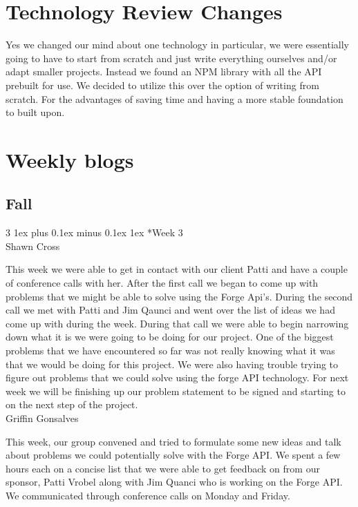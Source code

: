 \documentclass[letterpaper, 10pt, draftclsnofoot, compsoc, onecolumn]{IEEEtran}
\makeatletter
\def\subsubsection{\@startsection{subsubsection}%
                                 {3}%
                                 {\z@}%
                                 {1ex plus 0.1ex minus 0.1ex}%
                                 {1ex}%
                                 {\normalfont\normalsize}}%
\makeatother
\begin{document}
\newpage

\section{Technology Review Changes}
Yes we changed our mind about one technology in particular, we were essentially going to have to start from scratch and just write everything ourselves and/or adapt smaller projects. Instead we found an NPM library with all the API prebuilt for use. We decided to utilize this over the option of writing from scratch. For the advantages of saving time and having a more stable foundation to built upon.

\newpage

\section{Weekly blogs}
\subsection{Fall}
\subsubsection*{Week 3}\hspace*{\fill} \\

Shawn Cross

This week we were able to get in contact with our client Patti and have a couple of conference calls with her. After the first call we began to come up with problems that we might be able to solve using the Forge Api's. During the second call we met with Patti and Jim Qaunci and went over the list of ideas we had come up with during the week. During that call we were able to begin narrowing down what it is we were going to be doing for our project. One of the biggest problems that we have encountered so far was not really knowing what it was that we would be doing for this project. We were also having trouble trying to figure out problems that we could solve using the forge API technology. For next week we will be finishing up our problem statement to be signed and starting to on the next step of the project.\\

Griffin Gonsalves

This week, our group convened and tried to formulate some new ideas and talk about problems we could potentially solve with the Forge API. We spent a few hours each on a concise list that we were able to get feedback on from our sponsor, Patti Vrobel along with Jim Quanci who is working on the Forge API. We communicated through conference calls on Monday and Friday.
\end{document}

